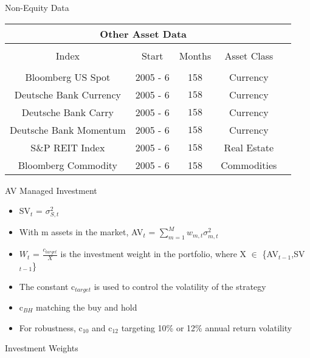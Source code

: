 \documentclass{beamer}
\begin{document}
\begin{frame}{Non-Equity Data}
	\begin{adjustbox}{width=\textwidth}
		\begin{tabular}{ccccc}
			\multicolumn{4}{c}{Other Asset Data}\\
			\hline \hline \\[-1.8ex] 
			Index & Start & Months  & Asset Class\\
			\hline\\
			Bloomberg US Spot & 2005 - 6 & 158 & Currency\\
			Deutsche Bank Currency & 2005 - 6 & $158$& Currency \\ 
			Deutsche Bank Carry & 2005 - 6 & $158$& Currency \\ 
			Deutsche Bank Momentum & 2005 - 6 & $158$& Currency \\ 
			S\&P REIT Index & 2005 - 6 & $158$& Real Estate \\
			Bloomberg Commodity & 2005 - 6 &158 & Commodities\\
			\hline
		\end{tabular}
	\end{adjustbox}
\end{frame}
\begin{frame}{AV Managed Investment}
	\begin{itemize}
		\item SV$_{t}$ = $\sigma^{2}_{S,t}$
		\item With m assets in the market, AV$_{t}$ = $\sum_{m=1}^{M} w_{m,t}\sigma^{2}_{m,t}$
		\item $W_{t}$ = $\frac{c_{target}}{X}$ is the investment weight in the portfolio, where X $\in$ \{AV$_{t-1}$,SV$_{t-1}$\}
		\item The constant c$_{target}$ is used to control the volatility of the strategy
		\item c$_{BH}$ matching the buy and hold
		\item For robustness, c$_{10}$ and c$_{12}$ targeting 10\% or 12\% annual return volatility
	\end{itemize}
\end{frame}

\begin{frame}{Investment Weights}
	\begin{figure}
		\scalebox{.52}{}
	\end{figure}
\end{frame}
\end{document}
